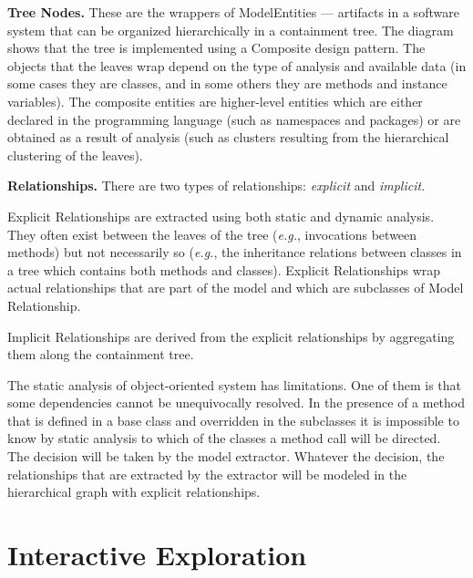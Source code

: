 \documentclass[preprint,12pt]{elsarticle}
\newcommand{\eg}{\emph{e.g.},\xspace}
\begin{document}
\begin{description}

\item {\bf Tree Nodes.} These are the wrappers of ModelEntities --- artifacts in a software system that can be organized hierarchically in a containment tree. The diagram shows that the tree is implemented using a Composite design pattern. The objects that the leaves wrap depend on the type of analysis and available data (in some cases they are classes, and in some others they are methods and instance variables). The composite entities are higher-level entities which are either declared in the programming language (such as namespaces and packages) or are obtained as a result of analysis (such as clusters resulting from the hierarchical clustering of the leaves).

\item {\bf Relationships.} There are two types of relationships: {\em explicit} and {\em implicit}.

Explicit Relationships are extracted using both static and dynamic analysis. They often exist between the leaves of the tree (\eg invocations between methods) but not necessarily so (\eg the inheritance relations between classes in a tree which contains both methods and classes). Explicit Relationships wrap actual relationships that are part of the model and which are subclasses of Model Relationship.

Implicit Relationships are derived from the explicit relationships by aggregating them along the containment tree. 

\end{description}

The static analysis of object-oriented system has limitations. One of them is that some dependencies cannot be unequivocally resolved. In the presence of a method that is defined in a base class and overridden in the subclasses it is impossible to know by static analysis to which of the classes a method call will be directed. The decision will be taken by the model extractor. Whatever the decision, the relationships that are extracted by the extractor will be modeled in the hierarchical graph with explicit relationships.

\section {Interactive Exploration} \label {sec:interact}
\end{document}
